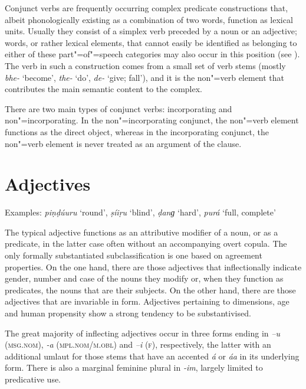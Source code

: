 Conjunct verbs are frequently occurring complex predicate constructions that, albeit phonologically existing as a combination of two words, function as lexical units. Usually they consist of a simplex verb preceded by a noun or an adjective; words, or rather lexical elements, that cannot easily be identified as belonging to either of these part"=of"=speech categories may also occur in this position (see ). The verb in such a construction comes from a small set of verb stems (mostly \textit{bhe-} `become', \textit{the-} `do', \textit{de-} `give; fall'), and it is the non"=verb element that contributes the main semantic content to the complex.


There are two main types of conjunct verbs: incorporating and non"=incorporating. In the non"=incorporating conjunct, the non"=verb element functions as the direct object, whereas in the incorporating conjunct, the non"=verb element is never treated as an argument of the clause.

\largerpage[-1]
\section{Adjectives}
\label{sec:3b-4}
Examples: \textit{piṇḍúuru} `round', \textit{ṣíiṛu} `blind', \textit{ḍanɡ} `hard', \textit{purá} `full, complete'


The typical adjective functions as an attributive modifier of a noun, or as a predicate, in the latter case often without an accompanying overt copula. The only formally substantiated subclassification is one based on agreement properties. On the one hand, there are those adjectives that inflectionally indicate gender, number and case of the nouns they modify or, when they function as predicates, the nouns that are their subjects. On the other hand, there are those adjectives that are invariable in form. Adjectives pertaining to dimensions, age and human propensity show a strong tendency to be substantivised.


The great majority of inflecting adjectives occur in three forms ending in \textit{–u} (\textsc{msg.nom}),  \textit{-a} (\textsc{mpl.nom/m.obl}) and \textit{–i} (\textsc{f}), respectively, the latter with an additional umlaut for those stems that have an accented \textit{á} or \textit{áa} in its underlying form. There is also a marginal feminine plural in \textit{-im}, largely limited to predicative use.  


